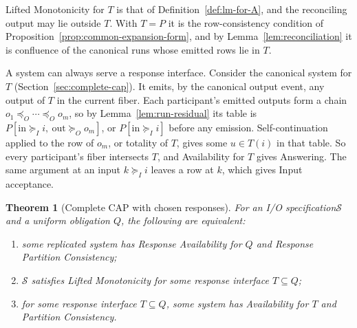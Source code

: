 \documentclass[sigconf]{cidr-2027}
\newtheorem{theorem}{Theorem}
\theoremstyle{remark}
\newcommand{\OutputOrd}{\preceq_O}
\newcommand{\InputGe}{\succeq_I}
\newcommand{\OutputGe}{\succeq_O}
\newcommand{\Spec}{\mathcal{S}}
\newcommand{\spectype}[1][]{I/O specification#1\xspace}
\begin{document}
Lifted Monotonicity for $T$ is that of Definition~\ref{def:lm-for-A}, and
the reconciling output may lie outside $T$. With $T=P$ it is the
row-consistency condition of Proposition~\ref{prop:common-expansion-form}, and
by Lemma~\ref{lem:reconciliation} it is confluence of the canonical runs whose
emitted rows lie in $T$.

A system can always serve a response interface. Consider the canonical system
for $T$ (Section~\ref{sec:complete-cap}). It emits, by the canonical output
event, any output of $T$ in the current fiber. Each participant's emitted
outputs form a chain $o_1\OutputOrd\cdots\OutputOrd o_m$, so by
Lemma~\ref{lem:run-residual} its table is
$P[\mathrm{in}\InputGe i,\ \mathrm{out}\OutputGe o_m]$, or
$P[\mathrm{in}\InputGe i]$ before any emission. Self-continuation applied to
the row of $o_m$, or totality of $T$, gives some $u\in T(i)$ in that table. So every participant's fiber intersects $T$, and Availability for $T$ gives
Answering. The same argument at an input $k\InputGe i$ leaves a row at $k$,
which gives Input acceptance.

\begin{theorem}[Complete CAP with chosen responses]
\label{thm:complete-cap-response}
For an \spectype $\Spec$ and a uniform obligation $Q$,
the following are equivalent:
\begin{enumerate}
\item
some replicated system has Response Availability for $Q$ and
        Response Partition Consistency;
\item
$\Spec$ satisfies Lifted Monotonicity for some response interface $T\subseteq Q$;
\item
for some response interface $T\subseteq Q$, some system has
        Availability for $T$ and Partition Consistency.
\end{enumerate}
\end{theorem}
\end{document}
